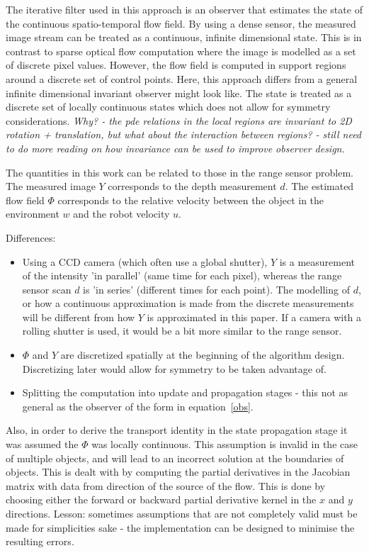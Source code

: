 The iterative filter used in this approach is an observer that estimates the state of the continuous spatio-temporal flow field. By using a dense sensor, the measured image stream can be treated as a continuous, infinite dimensional state. This is in contrast to sparse optical flow computation where the image is modelled as a set of discrete pixel values. However, the flow field is computed in support regions around a discrete set of control points. Here, this approach differs from a general infinite dimensional invariant observer might look like. The state is treated as a discrete set of locally continuous states which does not allow for symmetry considerations. \textit{Why? - the pde relations in the local regions are invariant to 2D rotation + translation, but what about the interaction between regions? - still need to do more reading on how invariance can be used to improve observer design.}

The quantities in this work can be related to those in the range sensor problem.
The measured image $Y$ corresponds to the depth measurement $d$. The estimated flow field $\Phi$ corresponds to the relative velocity between the object in the environment $w$ and the robot velocity $u$.

Differences:
\begin{itemize}
\item Using a CCD camera (which often use a global shutter), $Y$ is a measurement of the intensity 'in parallel' (same time for each pixel), whereas the range sensor scan $d$ is 'in series' (different times for each point). The modelling of $d$, or how a continuous approximation is made from the discrete measurements will be different from how $Y$ is approximated in this paper. If a camera with a rolling shutter is used, it would be a bit more similar to the range sensor. 
\item $\Phi$ and $Y$ are discretized spatially at the beginning of the algorithm design. Discretizing later would allow for symmetry to be taken advantage of.
\item Splitting the computation into update and propagation stages - this not as general as the observer of the form in equation~\eqref{obs}.
\end{itemize}
 
Also, in order to derive the transport identity in the state propagation stage it was assumed the $\Phi$ was locally continuous. This assumption is invalid in the case of multiple objects, and will lead to an incorrect solution at the boundaries of objects. This is dealt with by computing the partial derivatives in the Jacobian matrix with data from direction of the source of the flow. This is done by choosing either the forward or backward partial derivative kernel in the $x$ and $y$ directions. Lesson: sometimes assumptions that are not completely valid must be made for simplicities sake - the implementation can be designed to minimise the resulting errors.

